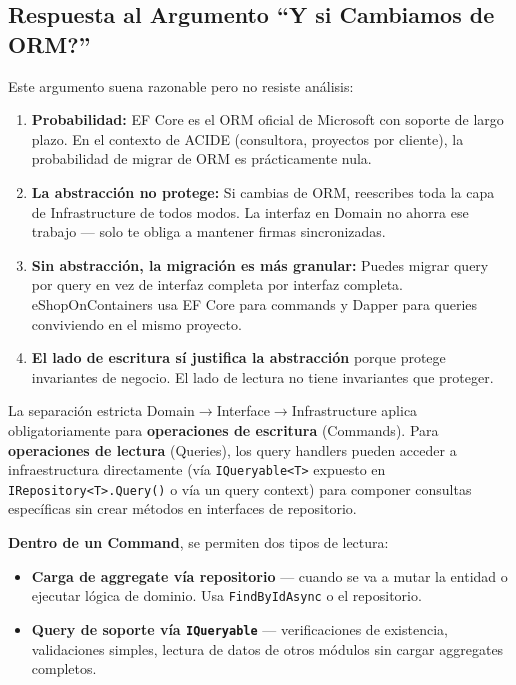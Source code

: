 \documentclass[12pt,a4paper]{article}
\begin{document}
\subsection{Respuesta al Argumento ``\textquestiondown Y si Cambiamos de ORM?''}

Este argumento suena razonable pero no resiste an\'alisis:

\begin{enumerate}[leftmargin=2em]
    \item \textbf{Probabilidad:} EF Core es el ORM oficial de Microsoft con soporte de largo plazo. En el contexto de ACIDE (consultora, proyectos por cliente), la probabilidad de migrar de ORM es pr\'acticamente nula.
    \item \textbf{La abstracci\'on no protege:} Si cambias de ORM, reescribes toda la capa de Infrastructure de todos modos. La interfaz en Domain no ahorra ese trabajo --- solo te obliga a mantener firmas sincronizadas.
    \item \textbf{Sin abstracci\'on, la migraci\'on es m\'as granular:} Puedes migrar query por query en vez de interfaz completa por interfaz completa. eShopOnContainers usa EF Core para commands y Dapper para queries conviviendo en el mismo proyecto.
    \item \textbf{El lado de escritura s\'i justifica la abstracci\'on} porque protege invariantes de negocio. El lado de lectura no tiene invariantes que proteger.
\end{enumerate}

\begin{proposalbox}
La separaci\'on estricta Domain$\to$Interface$\to$Infrastructure aplica obligatoriamente para \textbf{operaciones de escritura} (Commands). Para \textbf{operaciones de lectura} (Queries), los query handlers pueden acceder a infraestructura directamente (v\'ia \texttt{IQueryable<T>} expuesto en \texttt{IRepository<T>.Query()} o v\'ia un query context) para componer consultas espec\'ificas sin crear m\'etodos en interfaces de repositorio.

\medskip
\textbf{Dentro de un Command}, se permiten dos tipos de lectura:
\begin{itemize}[leftmargin=1.5em]
    \item \textbf{Carga de aggregate v\'ia repositorio} --- cuando se va a mutar la entidad o ejecutar l\'ogica de dominio. Usa \texttt{FindByIdAsync} o el repositorio.
    \item \textbf{Query de soporte v\'ia \texttt{IQueryable}} --- verificaciones de existencia, validaciones simples, lectura de datos de otros m\'odulos sin cargar aggregates completos.
\end{itemize}
\end{proposalbox}
\end{document}
